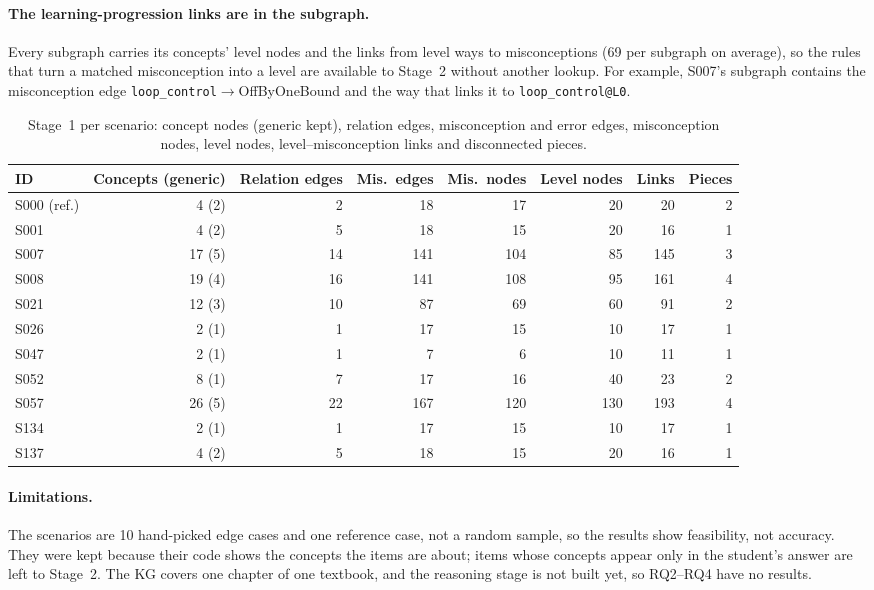 \documentclass[sigconf,nonacm]{acmart}
\newcommand{\code}[1]{\texttt{#1}}
\begin{document}
\paragraph{The learning-progression links are in the subgraph.} Every subgraph carries its concepts' level nodes and the
links from level ways to misconceptions (69 per subgraph on average), so the rules that turn a matched misconception into
a level are available to Stage~2 without another lookup. For example, S007's subgraph contains the misconception edge
\code{loop\_control}$\to$OffByOneBound and the way that links it to \code{loop\_control@L0}.

\begin{table}[t]
\caption{Stage~1 per scenario: concept nodes (generic kept), relation edges, misconception and error edges,
misconception nodes, level nodes, level--misconception links and disconnected pieces.}
\label{tab:perscenario}
\small
\begin{tabular}{lrrrrrrr}
\toprule
ID & Concepts (generic) & Relation edges & Mis.\ edges & Mis.\ nodes & Level nodes & Links & Pieces \\
\midrule
S000 (ref.) & 4 (2) & 2 & 18 & 17 & 20 & 20 & 2 \\
S001 & 4 (2) & 5 & 18 & 15 & 20 & 16 & 1 \\
S007 & 17 (5) & 14 & 141 & 104 & 85 & 145 & 3 \\
S008 & 19 (4) & 16 & 141 & 108 & 95 & 161 & 4 \\
S021 & 12 (3) & 10 & 87 & 69 & 60 & 91 & 2 \\
S026 & 2 (1) & 1 & 17 & 15 & 10 & 17 & 1 \\
S047 & 2 (1) & 1 & 7 & 6 & 10 & 11 & 1 \\
S052 & 8 (1) & 7 & 17 & 16 & 40 & 23 & 2 \\
S057 & 26 (5) & 22 & 167 & 120 & 130 & 193 & 4 \\
S134 & 2 (1) & 1 & 17 & 15 & 10 & 17 & 1 \\
S137 & 4 (2) & 5 & 18 & 15 & 20 & 16 & 1 \\
\bottomrule
\end{tabular}
\end{table}

\paragraph{Limitations.} The scenarios are 10 hand-picked edge cases and one reference case, not a random sample, so the
results show feasibility, not accuracy. They were kept because their code shows the concepts the items are about; items
whose concepts appear only in the student's answer are left to Stage~2. The KG covers one chapter of one textbook, and the
reasoning stage is not built yet, so RQ2--RQ4 have no results.
\end{document}
